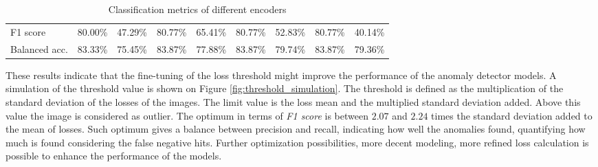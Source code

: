 \begin{table}[!ht]
\begin{tabular}{l | c c | c c | c c | c c}
        \hline
        F1 score        & 80.00\%                    & 47.29\%                       & 80.77\%                       & 65.41\%                             & 80.77\%  & 52.83\% & 80.77\%  & 40.14\% \\
        Balanced acc.   & 83.33\%                    & 75.45\%                       & 83.87\%                       & 77.88\%                             & 83.87\%  & 79.74\% & 83.87\%  & 79.36\% \\
    \end{tabular}
    \caption{Classification metrics of different encoders}
    \label{table:classification_metrics}
\end{table}

These results indicate that the fine-tuning of the loss threshold might improve the performance
of the anomaly detector models.
A simulation of the threshold value is shown on Figure \ref{fig:threshold_simulation}.
The threshold is defined as the multiplication of the standard deviation of the losses of the images.
The limit value is the loss mean and the multiplied standard deviation added.
Above this value the image is considered as outlier.
The optimum in terms of \emph{F1 score} is between $2.07$ and $2.24$ times the standard deviation added
to the mean of losses.
Such optimum gives a balance between precision and recall, indicating how well the anomalies found,
quantifying how much is found considering the false negative hits.
Further optimization possibilities, more decent modeling, more refined loss calculation is possible
to enhance the performance of the models.

